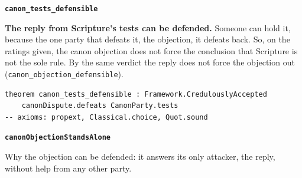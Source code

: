 \documentclass[11pt]{article}
\begin{document}
\par\medskip\noindent\textbf{\texttt{canon\_\allowbreak{}tests\_\allowbreak{}defensible}}\par\nobreak\noindent
\textbf{The reply from Scripture’s tests can be defended.} Someone can hold it, because the one party that defeats it, the objection, it defeats back. So, on the ratings given, the canon objection does not force the conclusion that Scripture is not the sole rule. By the same verdict the reply does not force the objection out (\texttt{canon\_\allowbreak{}objection\_\allowbreak{}defensible}).

{\small\begin{verbatim}
theorem canon_tests_defensible : Framework.CredulouslyAccepted
    canonDispute.defeats CanonParty.tests
-- axioms: propext, Classical.choice, Quot.sound
\end{verbatim}}
\par\medskip\noindent\textbf{\texttt{canon\allowbreak{}Objection\allowbreak{}Stands\allowbreak{}Alone}}\par\nobreak\noindent
Why the objection can be defended: it answers its only attacker, the reply, without help from any other party.
\end{document}

